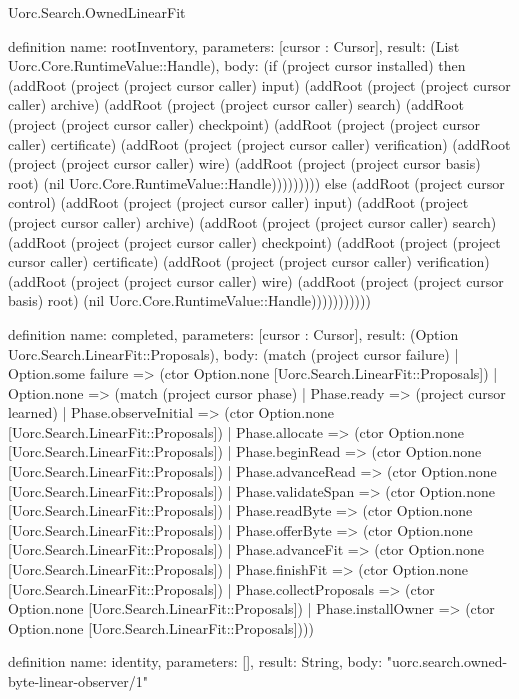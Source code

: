 \begin{lexlean}{Uorc.Search.OwnedLinearFit}
\begin{semanticmodule}
definition{
  name: rootInventory,
  parameters: [cursor : Cursor],
  result: (List Uorc.Core.RuntimeValue::Handle),
  body: (if (project cursor installed) then (addRoot (project (project cursor caller) input) (addRoot (project (project cursor caller) archive) (addRoot (project (project cursor caller) search) (addRoot (project (project cursor caller) checkpoint) (addRoot (project (project cursor caller) certificate) (addRoot (project (project cursor caller) verification) (addRoot (project (project cursor caller) wire) (addRoot (project (project cursor basis) root) (nil Uorc.Core.RuntimeValue::Handle))))))))) else (addRoot (project cursor control) (addRoot (project (project cursor caller) input) (addRoot (project (project cursor caller) archive) (addRoot (project (project cursor caller) search) (addRoot (project (project cursor caller) checkpoint) (addRoot (project (project cursor caller) certificate) (addRoot (project (project cursor caller) verification) (addRoot (project (project cursor caller) wire) (addRoot (project (project cursor basis) root) (nil Uorc.Core.RuntimeValue::Handle)))))))))))
}

definition{
  name: completed,
  parameters: [cursor : Cursor],
  result: (Option Uorc.Search.LinearFit::Proposals),
  body: (match (project cursor failure)
    | Option.some failure => (ctor Option.none [Uorc.Search.LinearFit::Proposals])
    | Option.none => (match (project cursor phase)
      | Phase.ready => (project cursor learned)
      | Phase.observeInitial => (ctor Option.none [Uorc.Search.LinearFit::Proposals])
      | Phase.allocate => (ctor Option.none [Uorc.Search.LinearFit::Proposals])
      | Phase.beginRead => (ctor Option.none [Uorc.Search.LinearFit::Proposals])
      | Phase.advanceRead => (ctor Option.none [Uorc.Search.LinearFit::Proposals])
      | Phase.validateSpan => (ctor Option.none [Uorc.Search.LinearFit::Proposals])
      | Phase.readByte => (ctor Option.none [Uorc.Search.LinearFit::Proposals])
      | Phase.offerByte => (ctor Option.none [Uorc.Search.LinearFit::Proposals])
      | Phase.advanceFit => (ctor Option.none [Uorc.Search.LinearFit::Proposals])
      | Phase.finishFit => (ctor Option.none [Uorc.Search.LinearFit::Proposals])
      | Phase.collectProposals => (ctor Option.none [Uorc.Search.LinearFit::Proposals])
      | Phase.installOwner => (ctor Option.none [Uorc.Search.LinearFit::Proposals])))
}

definition{
  name: identity,
  parameters: [],
  result: String,
  body: "uorc.search.owned-byte-linear-observer/1"
}


\end{semanticmodule}
\end{lexlean}
